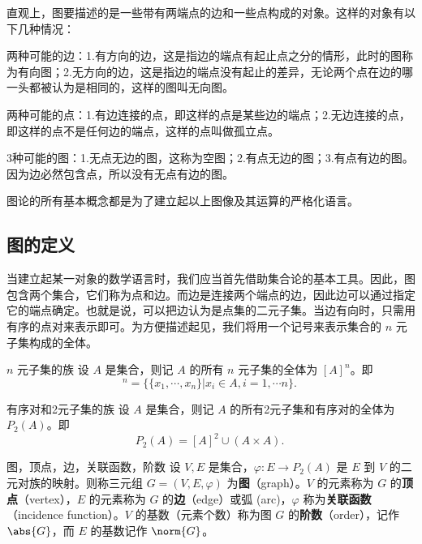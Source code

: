 
\begin{issues}
\issueTODO
\end{issues}


\cite{graph1}\cite{graph2}直观上，图要描述的是一些带有两端点的边和一些点构成的对象。这样的对象有以下几种情况：

两种可能的边：1.有方向的边，这是指边的端点有起止点之分的情形，此时的图称为有向图；2.无方向的边，这是指边的端点没有起止的差异，无论两个点在边的哪一头都被认为是相同的，这样的图叫无向图。

两种可能的点：1.有边连接的点，即这样的点是某些边的端点；2.无边连接的点，即这样的点不是任何边的端点，这样的点叫做孤立点。

3种可能的图：1.无点无边的图，这称为空图；2.有点无边的图；3.有点有边的图。因为边必然包含点，所以没有无点有边的图。

图论的所有基本概念都是为了建立起以上图像及其运算的严格化语言。


\subsection{图的定义}

当建立起某一对象的数学语言时，我们应当首先借助集合论的基本工具。因此，图包含两个集合，它们称为点和边。而边是连接两个端点的边，因此边可以通过指定它的端点确定。也就是说，可以把边认为是点集的二元子集。当边有向时，只需用有序的点对来表示即可。为方便描述起见，我们将用一个记号来表示集合的 $n$ 元子集构成的全体。

\begin{definition}{$n$ 元子集的族}
设 $A$ 是集合，则记 $A$ 的所有 $n$ 元子集的全体为 $[A]^n$。即
\begin{equation}
[A]^n=\{\{x_1,\cdots,x_n\}|x_i\in A,i=1,\cdots n\}.~
\end{equation}
\end{definition}

\begin{definition}{有序对和2元子集的族}
设 $A$ 是集合，则记 $A$ 的所有2元子集和有序对的全体为 $P_2(A)$。即
\begin{equation}
P_2(A)=[A]^2\cup (A\times A).~
\end{equation}

\end{definition}




\begin{definition}{图，顶点，边，关联函数，阶数}
设 $V,E$ 是集合，$\varphi:E\rightarrow P_2(A)$ 是 $E$ 到 $V$ 的二元对族的映射。则称三元组 $G=(V,E,\varphi)$ 为\textbf{图}（graph）。$V$ 的元素称为 $G$ 的\textbf{顶点}（vertex），$E$ 的元素称为 $G$ 的\textbf{边}（edge）或弧 (arc)，$\varphi$ 称为\textbf{关联函数}（incidence function）。$V$ 的基数（元素个数）称为图 $G$ 的\textbf{阶数}（order），记作 $\abs{G}$，而 $E$ 的基数记作 $\norm{G}$。
\end{definition}


